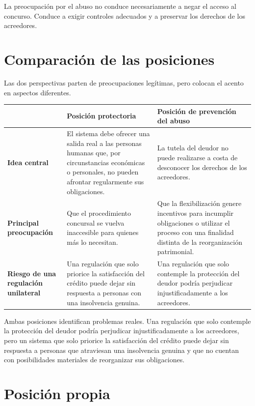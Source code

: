 \documentclass[12pt,oneside]{book}
\begin{document}
La preocupación por el abuso no conduce necesariamente a negar el acceso al concurso. Conduce a exigir controles adecuados y a preservar los derechos de los acreedores.

\section{Comparación de las posiciones}

Las dos perspectivas parten de preocupaciones legítimas, pero colocan el acento en aspectos diferentes.

\begin{table}[H]
\centering
\renewcommand{\arraystretch}{1.3}
\begin{tabularx}{\textwidth}{>{\raggedright\arraybackslash\bfseries}p{} >{\raggedright\arraybackslash}X >{\raggedright\arraybackslash}X}
\toprule
 & \textbf{Posición protectoria} & \textbf{Posición de prevención del abuso} \\
\midrule
Idea central &
El sistema debe ofrecer una salida real a las personas humanas que, por circunstancias económicas o personales, no pueden afrontar regularmente sus obligaciones. &
La tutela del deudor no puede realizarse a costa de desconocer los derechos de los acreedores. \\
Principal preocupación &
Que el procedimiento concursal se vuelva inaccesible para quienes más lo necesitan. &
Que la flexibilización genere incentivos para incumplir obligaciones o utilizar el proceso con una finalidad distinta de la reorganización patrimonial. \\
Riesgo de una regulación unilateral &
Una regulación que solo priorice la satisfacción del crédito puede dejar sin respuesta a personas con una insolvencia genuina. &
Una regulación que solo contemple la protección del deudor podría perjudicar injustificadamente a los acreedores. \\
\bottomrule
\end{tabularx}
\end{table}

Ambas posiciones identifican problemas reales. Una regulación que solo contemple la protección del deudor podría perjudicar injustificadamente a los acreedores, pero un sistema que solo priorice la satisfacción del crédito puede dejar sin respuesta a personas que atraviesan una insolvencia genuina y que no cuentan con posibilidades materiales de reorganizar sus obligaciones.

\section{Posición propia}
\end{document}
